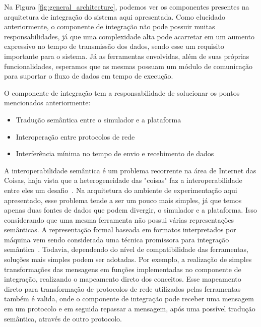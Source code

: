 Na Figura \ref{fig:general_architecture}, podemos ver os componentes presentes na arquitetura de integração do sistema aqui apresentada.
Como elucidado anteriormente, o componente de integração não pode possuir muitas responsabilidades, já que uma complexidade alta pode acarretar em um aumento expressivo no
tempo de transmissão dos dados, sendo esse um requisito importante para o sistema.
Já as ferramentas envolvidas, além de suas próprias funcionalidades, esperamos que as mesmas possuam um módulo de comunicação para suportar o fluxo de dados em tempo de execução.

O componente de integração tem a responsabilidade de solucionar os pontos mencionados anteriormente:

\begin{itemize}
    \item Tradução semântica entre o simulador e a plataforma

    \item Interoperação entre protocolos de rede

    \item Interferência mínima no tempo de envio e recebimento de dados
\end{itemize}

A interoperabilidade semântica é um problema recorrente na área de Internet das Coisas, haja vista que a heterogeneidade das "coisas"  faz a interoperabilidade entre eles um desafio~\cite{barnaghi_2012}.
Na arquitetura do ambiente de experimentação aqui apresentado, esse problema tende a ser um pouco mais simples, já que temos apenas duas fontes de dados que podem divergir, o simulador e a plataforma.
Isso considerando que uma mesma ferramenta não possui várias representações semânticas.
A representação formal baseada em formatos interpretados por máquina vem sendo considerada uma técnica promissora para integração semântica~\cite{barnaghi_2012}.
Todavia, dependendo do nível de compatibilidade das ferramentas, soluções mais simples podem ser adotadas.
Por exemplo, a realização de simples transformações das mensagens em funções implementadas no componente de integração, realizando o mapeamento direto dos conceitos.
Esse mapeamento direto para transformação de protocolos de rede utilizados pelas ferramentas também é valida, onde o componente de integração pode receber uma mensagem em um protocolo e em seguida repassar
a mensagem, após uma possível tradução semântica, através de outro protocolo.

